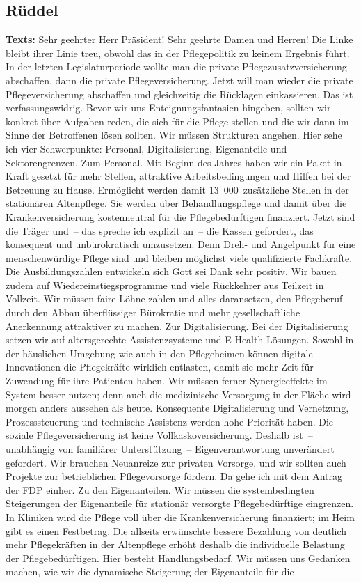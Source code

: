 \documentclass{article}
\begin{document}
\subsection{Rüddel}
\noindent\textbf{Texts:} Sehr geehrter Herr Präsident! Sehr geehrte Damen und Herren! Die Linke bleibt ihrer Linie treu,  obwohl das in der Pflegepolitik zu keinem Ergebnis führt. In der letzten Legislaturperiode wollte man die private Pflegezusatzversicherung abschaffen, dann die private Pflegeversicherung. Jetzt will man wieder die private Pflegeversicherung abschaffen und gleichzeitig die Rücklagen einkassieren. Das ist verfassungswidrig. Bevor wir uns Enteignungsfantasien hingeben, sollten wir konkret über Aufgaben reden, die sich für die Pflege stellen und die wir dann im Sinne der Betroffenen lösen sollten.  Wir müssen Strukturen angehen. Hier sehe ich vier Schwerpunkte: Personal, Digitalisierung, Eigenanteile und Sektorengrenzen. Zum Personal. Mit Beginn des Jahres haben wir ein Paket in Kraft gesetzt für mehr Stellen, attraktive Arbeitsbedingungen und Hilfen bei der Betreuung zu Hause. Ermöglicht werden damit 13 000 zusätzliche Stellen in der stationären Altenpflege. Sie werden über Behandlungspflege und damit über die Krankenversicherung kostenneutral für die Pflegebedürftigen finanziert. Jetzt sind die Träger und – das spreche ich explizit an – die Kassen gefordert, das konsequent und unbürokratisch umzusetzen.  Denn Dreh- und Angelpunkt für eine menschenwürdige Pflege sind und bleiben möglichst viele qualifizierte Fachkräfte. Die Ausbildungszahlen entwickeln sich Gott sei Dank sehr positiv. Wir bauen zudem auf Wiedereinstiegsprogramme und viele Rückkehrer aus Teilzeit in Vollzeit. Wir müssen faire Löhne zahlen und alles daransetzen, den Pflegeberuf durch den Abbau überflüssiger Bürokratie und mehr gesellschaftliche Anerkennung attraktiver zu machen.  Zur Digitalisierung. Bei der Digitalisierung setzen wir auf altersgerechte Assistenzsysteme und E-Health-Lösungen. Sowohl in der häuslichen Umgebung wie auch in den Pflegeheimen können digitale Innovationen die Pflegekräfte wirklich entlasten, damit sie mehr Zeit für Zuwendung für ihre Patienten haben. Wir müssen ferner Synergieeffekte im System besser nutzen; denn auch die medizinische Versorgung in der Fläche wird morgen anders aussehen als heute. Konsequente Digitalisierung und Vernetzung, Prozesssteuerung und technische Assistenz werden hohe Priorität haben. Die soziale Pflegeversicherung ist keine Vollkaskoversicherung. Deshalb ist – unabhängig von familiärer Unterstützung – Eigenverantwortung unverändert gefordert.  Wir brauchen Neuanreize zur privaten Vorsorge, und wir sollten auch Projekte zur betrieblichen Pflegevorsorge fördern. Da gehe ich mit dem Antrag der FDP einher.  Zu den Eigenanteilen. Wir müssen die systembedingten Steigerungen der Eigenanteile für stationär versorgte Pflegebedürftige eingrenzen. In Kliniken wird die Pflege voll über die Krankenversicherung finanziert; im Heim gibt es einen Festbetrag. Die allseits erwünschte bessere Bezahlung von deutlich mehr Pflegekräften in der Altenpflege erhöht deshalb die individuelle Belastung der Pflegebedürftigen. Hier besteht Handlungsbedarf. Wir müssen uns Gedanken machen, wie wir die dynamische Steigerung der Eigenanteile für die 
\end{document}
